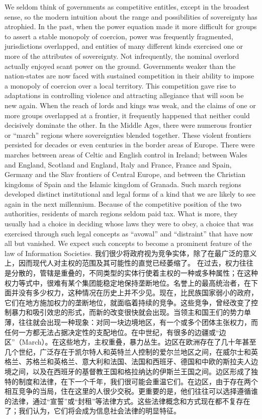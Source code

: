 \begin{Parallel}{97mm}{45mm}
  \ParallelLText
  {We seldom think of governments as competitive entitles, except in the broadest sense, so the modern intuition about the range and possibilities of sovereignty has atrophied. In the past, when the power equation made it more difficult for groups to assert a stable monopoly of coercion, power was frequently fragmented, jurisdictions overlapped, and entities of many different kinds exercised one or more of the attributes of sovereignty. Not infrequently, the nominal overlord actually enjoyed scant power on the ground. Governments weaker than the nation-states are now faced with sustained competition in their ability to impose a monopoly of coercion over a local territory. This competition gave rise to adaptations in controlling violence and attracting allegiance that will soon be new again.   When the reach of lords and kings was weak, and the claims of one or more groups overlapped at a frontier, it frequently happened that neither could decisively dominate the other. In the Middle Ages, there were numerous frontier or “march” regions where sovereignties blended together. These violent frontiers persisted for decades or even centuries in the border areas of Europe. There were marches between areas of Celtic and English control in Ireland; between Wales and England, Scotland and England, Italy and France, France and Spain, Germany and the Slav frontiers of Central Europe, and between the Christian kingdoms of Spain and the Islamic kingdom of Granada. Such march regions developed distinct institutional and legal forms of a kind that we are likely to see again in the next millennium. Because of the competitive position of the two authorities, residents of march regions seldom paid tax. What is more, they usually had a choice in deciding whose laws they were to obey, a choice that was exercised through such legal concepts as “avowal” and “distraint” that have now all but vanished. We expect such concepts to become a prominent feature of the law of Information Societies. }  
  \ParallelRText
  {\small 我们很少将政府视为竞争实体，除了在最广泛的意义上，因而现代人对主权的范围及其可能性的直觉已经萎缩了。 在过去，权力往往是分散的，管辖是重叠的，不同类型的实体行使着主权的一种或多种属性；在这种权力等式中，很难有某个集团能稳定地保持垄断地位。名誉上的最高统治者，在下面并没有多少权力，这种情况在历史上并不少见。现在，比民族国家弱小的政府，它们在地方施加权力的垄断地位，就面临着持续的竞争。这些竞争，曾经改变了控制暴力和吸引效忠的形式，而新的改变很快就会出现。当领主和国王们的势力单薄，往往就会出现一种现象：对同一块边境地区，有一个或多个团体主张权力，而任何一方都无法占据决定性的支配地位。在中世纪，有很多的边疆或“边区”（March）。在这些地方，主权重叠，暴力丛生。边区在欧洲存在了几十年甚至几个世纪，广泛存在于凯尔特人和英特兰人控制的爱尔兰地区之间，在威尔士和英格兰、苏格兰和英格兰、意大利和法国、法国和西班牙、德国和中欧的斯拉夫人边境之间，以及在西班牙的基督教王国和格拉纳达的伊斯兰王国之间。边区形成了独特的制度和法律，在下一个千年，我们很可能会重温它们。在边区，由于存在两个相互竞争的当局，住在这里的人很少交税。更重要的是，他们往往可以选择遵循谁的法律，通过“宣誓”或“封租”等法律方式。这些法律概念和方式现在都不复存在了；我们认为，它们将会成为信息社会法律的明显特征。}
  \ParallelPar


\end{Parallel}
